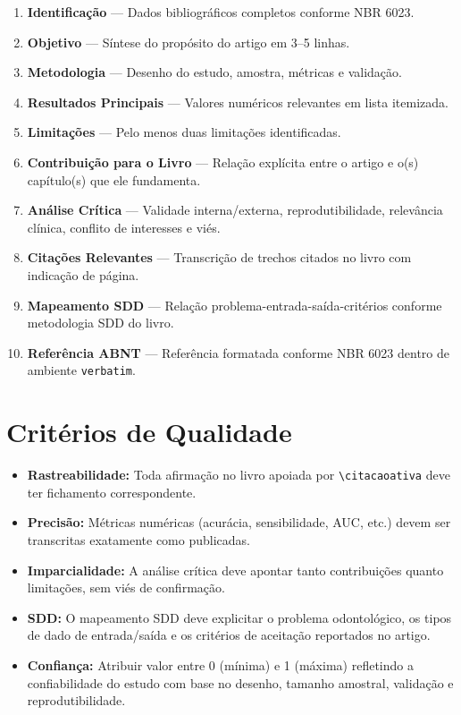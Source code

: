 \begin{enumerate}
  \item \textbf{Identificação} — Dados bibliográficos completos conforme
        NBR 6023.
  \item \textbf{Objetivo} — Síntese do propósito do artigo em 3--5 linhas.
  \item \textbf{Metodologia} — Desenho do estudo, amostra, métricas e
        validação.
  \item \textbf{Resultados Principais} — Valores numéricos relevantes em
        lista itemizada.
  \item \textbf{Limitações} — Pelo menos duas limitações identificadas.
  \item \textbf{Contribuição para o Livro} — Relação explícita entre o
        artigo e o(s) capítulo(s) que ele fundamenta.
  \item \textbf{Análise Crítica} — Validade interna/externa,
        reprodutibilidade, relevância clínica, conflito de interesses e
        viés.
  \item \textbf{Citações Relevantes} — Transcrição de trechos citados no
        livro com indicação de página.
  \item \textbf{Mapeamento SDD} — Relação problema-entrada-saída-critérios
        conforme metodologia SDD do livro.
  \item \textbf{Referência ABNT} — Referência formatada conforme NBR 6023
        dentro de ambiente \texttt{verbatim}.
\end{enumerate}

\section*{Critérios de Qualidade}
\begin{itemize}
  \item \textbf{Rastreabilidade:} Toda afirmação no livro apoiada por
        \texttt{\textbackslash citacaoativa} deve ter fichamento
        correspondente.
  \item \textbf{Precisão:} Métricas numéricas (acurácia, sensibilidade,
        AUC, etc.) devem ser transcritas exatamente como publicadas.
  \item \textbf{Imparcialidade:} A análise crítica deve apontar tanto
        contribuições quanto limitações, sem viés de confirmação.
  \item \textbf{SDD:} O mapeamento SDD deve explicitar o problema
        odontológico, os tipos de dado de entrada/saída e os critérios de
        aceitação reportados no artigo.
  \item \textbf{Confiança:} Atribuir valor entre 0 (mínima) e 1 (máxima)
        refletindo a confiabilidade do estudo com base no desenho, tamanho
        amostral, validação e reprodutibilidade.
\end{itemize}

